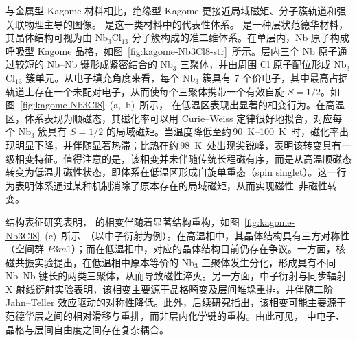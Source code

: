 与金属型 Kagome 材料相比，绝缘型 Kagome 更接近局域磁矩、分子簇轨道和强关联物理主导的图像。 是这一类材料中的代表性体系。 是一种层状范德华材料，其晶体结构可视为由 Nb$_3$Cl$_{13}$ 分子簇构成的准二维体系。在单层内，Nb 原子构成呼吸型 Kagome 晶格，如图~\ref{fig:kagome-Nb3Cl8-str}~所示。层内三个 Nb 原子通过较短的 Nb--Nb 键形成紧密结合的 Nb$_3$ 三聚体，并由周围 Cl 原子配位形成 Nb$_3$Cl$_{13}$ 簇单元\cite{haraguchiMagneticNonmagneticPhase2017}。从电子填充角度来看，每个 Nb$_3$ 簇具有 7 个价电子，其中最高占据轨道上存在一个未配对电子，从而使每个三聚体携带一个有效自旋 $S = 1/2$。如图~\ref{fig:kagome-Nb3Cl8}~(a,~b)~所示， 在低温区表现出显著的相变行为。在高温区，体系表现为顺磁态，其磁化率可以用 Curie--Weiss 定律很好地拟合，对应每个 Nb$_3$ 簇具有 $S = 1/2$ 的局域磁矩\cite{haraguchiMagneticNonmagneticPhase2017}。当温度降低至约\,\qtyrange{90}{100}{\kelvin}~时，磁化率出现明显下降，并伴随显著热滞；比热在约\,\qty{98}{\kelvin}~处出现尖锐峰\cite{sheckeltonRearrangementvanWaals2017}，表明该转变具有一级相变特征。值得注意的是，该相变并未伴随传统长程磁有序，而是从高温顺磁态转变为低温非磁性状态，即体系在低温区形成自旋单重态（spin singlet）\cite{pascoTunableMagneticTransition2019}。这一行为表明体系通过某种机制消除了原本存在的局域磁矩，从而实现磁性--非磁性转变。

结构表征研究表明， 的相变伴随着显著结构重构，如图~\ref{fig:kagome-Nb3Cl8}~(c)~所示~（以中子衍射为例）。在高温相中，其晶体结构具有三方对称性（空间群 $P\overline{3}m1$）；而在低温相中，对应的晶体结构目前仍存在争议\cite{haraguchiMagneticNonmagneticPhase2017,sheckeltonRearrangementvanWaals2017,pascoTunableMagneticTransition2019}。一方面，核磁共振实验提出，在低温相中原本等价的 Nb$_3$ 三聚体发生分化，形成具有不同 Nb--Nb 键长的两类三聚体，从而导致磁性淬灭\cite{haraguchiMagneticNonmagneticPhase2017}。另一方面，中子衍射与同步辐射 X 射线衍射实验表明，该相变主要源于晶格畸变及层间堆垛重排，并伴随二阶 Jahn--Teller 效应驱动的对称性降低\cite{sheckeltonRearrangementvanWaals2017}。此外，后续研究指出，该相变可能主要源于范德华层之间的相对滑移与重排，而非层内化学键的重构\cite{pascoTunableMagneticTransition2019}。由此可见， 中电子、晶格与层间自由度之间存在复杂耦合\cite{wangQuantumstatesintertwining2023a}。

